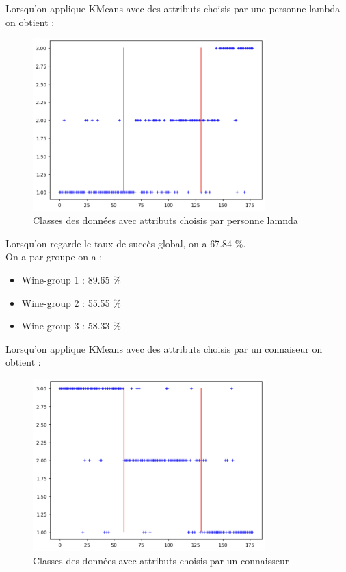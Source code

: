 \documentclass[a4paper,12pt]{article}
\begin{document}
Lorsqu'on applique KMeans avec des attributs choisis par une personne lambda on obtient :

\begin{figure}[h!] %
   \centering
   \includegraphics[width=0.8\textwidth]{normal_atributes.png} %
   \caption{Classes des données avec attributs choisis par personne lamnda}
\end{figure}
\newpage

Lorsqu'on regarde le taux de succès global, on a 67.84 \%.\\

On a par groupe on a :
\begin{itemize}
\item Wine-group 1 : 89.65 \%
\item Wine-group 2 : 55.55 \%
\item Wine-group 3 : 58.33 \%
\end{itemize}
\newpage

Lorsqu'on applique KMeans avec des attributs choisis par un connaiseur on obtient :

\begin{figure}[h!] %
   \centering
   \includegraphics[width=0.8\textwidth]{profetional_atributes.png} %
   \caption{Classes des données avec attributs choisis par un connaisseur}
\end{figure}
\end{document}
